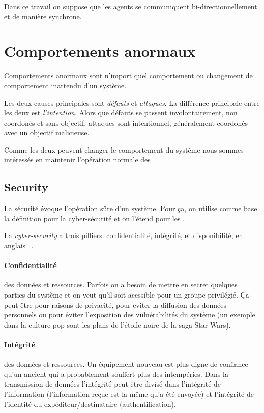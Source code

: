 \documentclass[../main.tex]{subfiles}
\begin{document}
Dans ce travail on suppose que les agents se communiquent bi-directionnellement et de manière synchrone.

\newpage
\section{Comportements anormaux}\label{sec:comp-anorm}
Comportements anormaux sont n'import quel comportement ou changement de comportement inattendu d'un système.

Les deux causes principales sont \emph{défauts} et \emph{attaques}.
La différence principale entre les deux est \emph{l'intention}.
Alors que défauts se passent involontairement, non coordonés et sans objectif, attaques sont intentionnel, généralement coordonés avec un objectif malicieuse.

Comme les deux peuvent changer le comportement du système nous sommes intéressés en maintenir l'opération normale des \cps{}.


\subsection{Security}\label{sec:security_fr}
La sécurité évoque l'opération sûre d'un système.
Pour ça, on utilise comme base la définition pour la cyber-sécurité et on l'étend pour les \cps{}.

La \emph{cyber-security} a trois pilliers: confidentialité, intégrité, et disponibilité, en anglais \CIA{}~\cite{Bishop2005}.

\paragraph{Confidentialité} des données et ressources.
Parfois on a besoin de mettre en secret quelques parties du système et on veut qu'il soit acessible pour un groupe privilégié.
Ça peut être pour raisons de privacité, pour eviter la diffusion des données personnels ou pour éviter l'exposition des vulnérabilités du système (un exemple dans la culture pop sont les plans de l'étoile noire de la saga Star Wars).

\paragraph{Intégrité} des données et ressources.
Un équipement nouveau est plus digne de confiance qu'un ancient qui a probablement souffert plus des intempéries.
Dans la transmission de données l'intégrité peut être divisé dans l'intégrité de l'information (l'information reçue est la même qu'a été envoyée) et l'intégrité de l'identité du expéditeur/destinataire (authentification).
\end{document}
